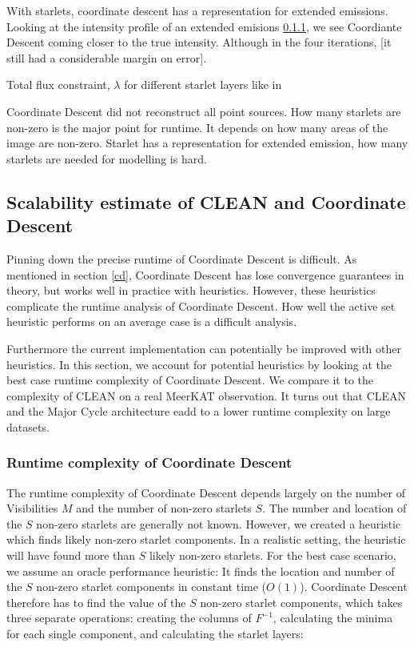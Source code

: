 With starlets, coordinate descent has a representation for extended emissions. Looking at the intensity profile of an extended emisions \ref{}, we see Coordiante Descent coming closer to the true intensity. Although in the four iterations,  [it still had a considerable margin on error]. 

Total flux constraint, $\lambda$ for different starlet layers like in \cite{girard2015sparse}

Coordinate Descent did not reconstruct all point sources. How many starlets are non-zero is the major point for runtime. It depends on how many areas of the image are non-zero. Starlet has a representation for extended emission, how many starlets are needed for modelling is hard.





\subsection{Scalability estimate of CLEAN and Coordinate Descent}
Pinning down the precise runtime of Coordinate Descent is difficult. As mentioned in section \ref{cd}, Coordinate Descent has lose convergence guarantees in theory, but works well in practice with heuristics. However, these heuristics complicate the runtime analysis of Coordinate Descent. How well the active set heuristic performs on an average case is a difficult analysis.

Furthermore the current implementation can potentially be improved with other heuristics. In this section, we account for potential heuristics by looking at the best case runtime complexity of Coordinate Descent. We compare it to the complexity of CLEAN on a real MeerKAT observation. It turns out that CLEAN and the Major Cycle architecture eadd to a lower runtime complexity on large datasets.

\subsubsection{Runtime complexity of Coordinate Descent}
The runtime complexity of Coordinate Descent depends largely on the number of Visibilities $M$ and the number of non-zero starlets $S$. The number and location of the $S$ non-zero starlets are generally not known. However, we created a heuristic which finds likely non-zero starlet components. In a realistic setting, the heuristic will have found more than $S$ likely non-zero starlets. For the best case scenario, we assume an oracle performance heuristic: It finds the location and number of the $S$ non-zero starlet components in constant time ($O(1)$). Coordinate Descent therefore has to find the value of the $S$ non-zero starlet components, which takes three separate operations: creating the columns of $F^{-1}$, calculating the minima for each single component, and calculating the starlet layers:

